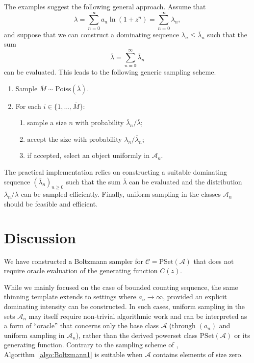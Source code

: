 \documentclass[a4paper,10pt]{article}
\theoremstyle{definition}
\newcommand{\Aa}{\mathcal{A}}
\newcommand{\Cc}{\mathcal{C}}
\newcommand{\PSet}{\mathrm{PSet}}
\begin{document}
The examples suggest the following general approach. Assume that
\begin{equation*}
    \lambda = \sum_{n=0}^{\infty} a_n \ln(1+z^n) = \sum_{n=0}^{\infty} \lambda_n,
\end{equation*}
and suppose that we can construct a dominating sequence $\lambda_n \leq \overline{\lambda}_n$ such that the sum
\begin{equation*}
    \overline{\lambda} = \sum_{n=0}^{\infty} \overline{\lambda}_n
\end{equation*}
can be evaluated. This leads to the following generic sampling scheme.
\begin{enumerate}
    \item Sample $\overline{M} \sim \mathrm{Poiss}(\overline{\lambda})$.

    \item For each $i\in\{1,\dots,\overline{M}\}$:
    \begin{enumerate}
        \item sample a size $n$ with probability
            $\overline{\lambda}_n/\overline{\lambda}$;

        \item accept the size with probability $\lambda_n/\overline{\lambda}_n$;

        \item if accepted, select an object uniformly in $\Aa_n$.
    \end{enumerate}
\end{enumerate}
The practical implementation relies on constructing a suitable
dominating sequence $(\overline{\lambda}_n)_{n\geq 0}$ such that the sum $\overline{\lambda}$ can be evaluated and the distribution $\overline{\lambda}_n/\overline{\lambda}$ can be sampled efficiently. Finally, uniform sampling in the classes $\Aa_n$ should be feasible and efficient.
    
\section{Discussion}
We have constructed a Boltzmann sampler for $\Cc = \PSet(\Aa)$ that does not require oracle evaluation of the generating function $C(z)$.

While we mainly focused on the case of bounded counting sequence, the same thinning template extends to settings where $a_n\to\infty$, provided an explicit dominating intensity can be constructed. In such cases, uniform sampling in the sets $\Aa_n$ may itself require non-trivial algorithmic work and can be interpreted as a form of ``oracle'' that concerns only the base class $\Aa$ (through $(a_n)$ and uniform sampling in $\Aa_n$), rather than the derived powerset class $\PSet(\Aa)$ or its generating function. Contrary to the sampling scheme of \cite{Flajolet}, Algorithm~\ref{algo:Boltzmann1} is suitable when $\Aa$ contains elements of size zero.
\end{document}
